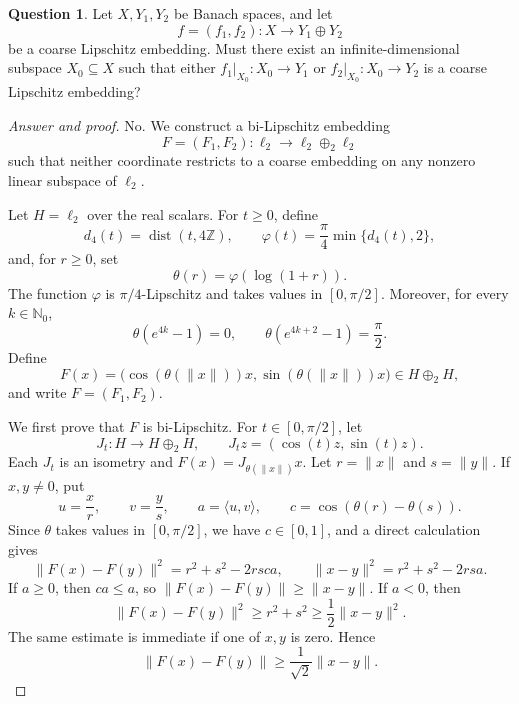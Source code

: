 \documentclass[11pt,reqno]{amsart}
\theoremstyle{plain}
\theoremstyle{definition}
\newtheorem{question}[question]{Question}
\begin{document}
\begin{question}
Let $X,Y_1,Y_2$ be Banach spaces, and let
\begin{equation*}
 f=(f_1,f_2)\colon X\longrightarrow Y_1\oplus Y_2
\end{equation*}
be a coarse Lipschitz embedding. Must there exist an infinite-dimensional subspace $X_0\subseteq X$ such that either $f_1|_{X_0}\colon X_0\to Y_1$ or $f_2|_{X_0}\colon X_0\to Y_2$ is a coarse Lipschitz embedding?
\end{question}

\begin{proof}[Answer and proof]
No. We construct a bi-Lipschitz embedding
\begin{equation*}
 F=(F_1,F_2)\colon\ell_2\longrightarrow\ell_2\oplus_2\ell_2
\end{equation*}
such that neither coordinate restricts to a coarse embedding on any nonzero linear subspace of $\ell_2$.

Let $H=\ell_2$ over the real scalars. For $t\geq0$, define
\begin{equation*}
 d_4(t)=\operatorname{dist}(t,4\mathbb Z),
 \qquad
 \varphi(t)=\frac\pi4\min\{d_4(t),2\},
\end{equation*}
and, for $r\geq0$, set
\begin{equation*}
 \theta(r)=\varphi(\log(1+r)).
\end{equation*}
The function $\varphi$ is $\pi/4$-Lipschitz and takes values in $[0,\pi/2]$. Moreover, for every $k\in\mathbb N_0$,
\begin{equation*}
 \theta(e^{4k}-1)=0, \qquad \theta(e^{4k+2}-1)=\frac\pi2.
\end{equation*}
Define
\begin{equation*}
 F(x)=\bigl(\cos(\theta(\|x\|))x,
             \sin(\theta(\|x\|))x\bigr)
 \in H\oplus_2H,
\end{equation*}
and write $F=(F_1,F_2)$.

We first prove that $F$ is bi-Lipschitz. For $t\in[0,\pi/2]$, let
\begin{equation*}
 J_t\colon H\longrightarrow H\oplus_2H,
 \qquad J_tz=(\cos(t)z,\sin(t)z).
\end{equation*}
Each $J_t$ is an isometry and $F(x)=J_{\theta(\|x\|)}x$. Let $r=\|x\|$ and $s=\|y\|$. If $x,y\neq0$, put
\begin{equation*}
 u=\frac xr,
 \qquad v=\frac ys,
 \qquad a=\langle u,v\rangle,
 \qquad c=\cos(\theta(r)-\theta(s)).
\end{equation*}
Since $\theta$ takes values in $[0,\pi/2]$, we have $c\in[0,1]$, and a direct calculation gives
\begin{equation*}
 \|F(x)-F(y)\|^2=r^2+s^2-2rsca,
 \qquad
 \|x-y\|^2=r^2+s^2-2rsa.
\end{equation*}
If $a\geq0$, then $ca\leq a$, so $\|F(x)-F(y)\|\geq\|x-y\|$. If $a<0$, then
\begin{equation*}
 \|F(x)-F(y)\|^2\geq r^2+s^2
 \geq\frac12\|x-y\|^2.
\end{equation*}
The same estimate is immediate if one of $x,y$ is zero. Hence
\begin{equation*}
 \|F(x)-F(y)\|\geq\frac1{\sqrt2}\|x-y\|.
\end{equation*}


\end{proof}
\end{document}
